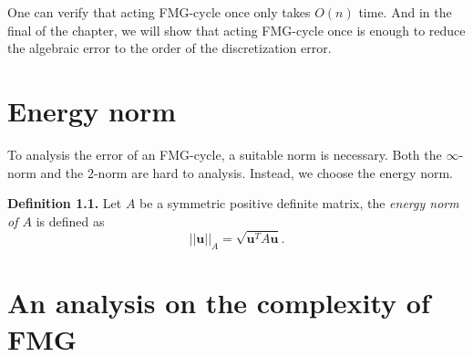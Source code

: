 \documentclass{SBCbookchapter}
\newcounter{chapter}\setcounter{chapter}{1}
\begin{document}
One can verify that acting FMG-cycle once only takes $O(n)$ time. And in the final of the chapter, we will show that acting FMG-cycle once is enough to reduce the algebraic error to the order of the discretization error.

\section{Energy norm}

To analysis the error of an FMG-cycle, a suitable norm is necessary. Both the $\infty$-norm and the $2$-norm are hard to analysis. Instead, we choose the energy norm.

\textbf{Definition 1.1.} Let $A$ be a symmetric positive definite matrix, the \textit{energy norm of $A$} is defined as
\begin{equation}
	||\mathbf{u}||_A=\sqrt{\mathbf{u}^TA\mathbf{u}}.
\end{equation}

\section{An analysis on the complexity of FMG}
\end{document}
